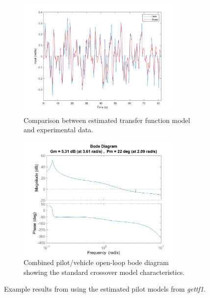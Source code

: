\begin{figure}[p]
    \centering
    \begin{subfigure}{\textwidth}
        \centering
        \includegraphics[width=0.9\textwidth]{figures/Modeling/model_output.png}
        \caption[Comparison between estimated transfer function model and experimental data]{Comparison between estimated transfer function model and experimental data.}
        \label{fig:comparison}
    \end{subfigure}
    \hfill
    \begin{subfigure}{\textwidth}
        \centering
        \includegraphics[width=0.9\textwidth]{figures/Modeling/YpYc_204.png}
        \caption[Combined pilot/vehicle open-loop bode diagram]{Combined pilot/vehicle open-loop bode diagram showing the standard crossover model characteristics.}
        \label{fig:bode}
    \end{subfigure}
    \caption[Example results from using the estimated pilot models from \textit{gettf1}]{Example results from using the estimated pilot models from \textit{gettf1}.}
\end{figure}

